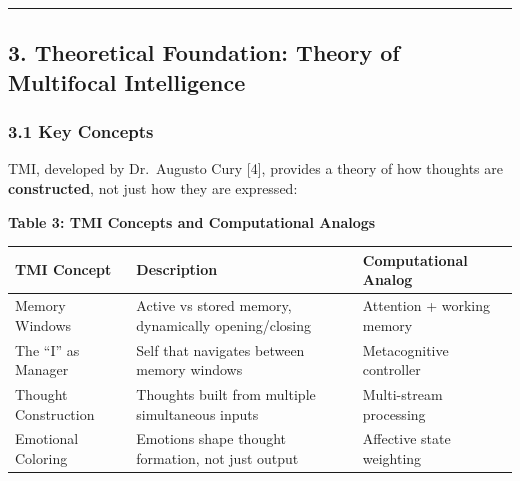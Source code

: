 \documentclass[
  11pt,
]{article}
\newcounter{none} %
\begin{document}
\begin{center}\rule{0.5\linewidth}{0.5pt}\end{center}

\subsection{3. Theoretical Foundation: Theory of Multifocal
Intelligence}\label{theoretical-foundation-theory-of-multifocal-intelligence}

\subsubsection{3.1 Key Concepts}\label{key-concepts}

TMI, developed by Dr.~Augusto Cury {[}4{]}, provides a theory of how
thoughts are \textbf{constructed}, not just how they are expressed:

\textbf{Table 3: TMI Concepts and Computational Analogs}

{\def\LTcaptype{none} %
\begin{longtable}[]{@{}
  >{\raggedright\arraybackslash}p{}
  >{\raggedright\arraybackslash}p{}
  >{\raggedright\arraybackslash}p{}@{}}
\toprule\noalign{}
\begin{minipage}[b]{\linewidth}\raggedright
TMI Concept
\end{minipage} & \begin{minipage}[b]{\linewidth}\raggedright
Description
\end{minipage} & \begin{minipage}[b]{\linewidth}\raggedright
Computational Analog
\end{minipage} \\
\midrule\noalign{}
\endhead
\bottomrule\noalign{}
\endlastfoot
Memory Windows & Active vs stored memory, dynamically opening/closing &
Attention + working memory \\
The ``I'' as Manager & Self that navigates between memory windows &
Metacognitive controller \\
Thought Construction & Thoughts built from multiple simultaneous inputs
& Multi-stream processing \\
Emotional Coloring & Emotions shape thought formation, not just output &
Affective state weighting \\
\end{longtable}
}
\end{document}
